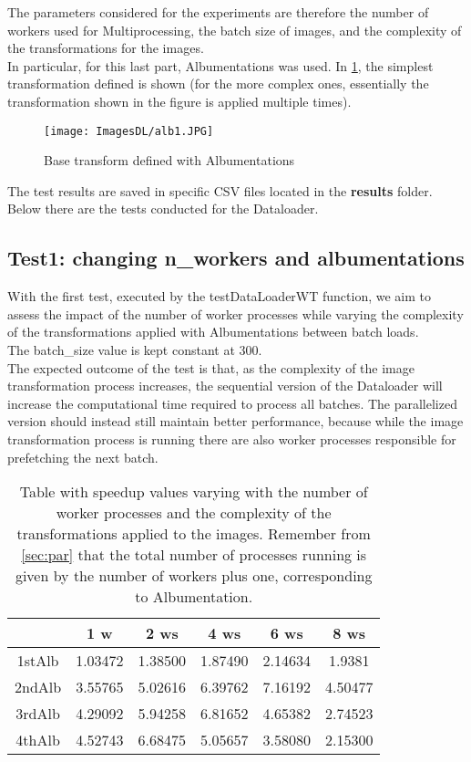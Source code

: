 \documentclass[10pt,twocolumn,letterpaper]{article}
\begin{document}
The parameters considered for the experiments are therefore the number of workers used for Multiprocessing, the batch size of images, and the complexity of the transformations for the images.\\
In particular, for this last part, Albumentations was used. In \cref{fig:alb1}, the simplest transformation defined is shown (for the more complex ones, essentially the transformation shown in the figure is applied multiple times).

\begin{figure}[h]
    \centering
    \texttt{[image: ImagesDL/alb1.JPG]}
    \caption{Base transform defined with Albumentations}
    \label{fig:alb1}
\end{figure}

The test results are saved in specific CSV files located in the \textbf{results} folder.\\
Below there are the tests conducted for the Dataloader.


\subsection{Test1: changing n\_workers and albumentations}


With the first test, executed by the testDataLoaderWT function, we aim to assess the impact of the number of worker processes while varying the complexity of the transformations applied with Albumentations between batch loads.\\
The batch\_size value is kept constant at 300.\\
The expected outcome of the test is that, as the complexity of the image transformation process increases, the sequential version of the Dataloader will increase the computational time required to process all batches. The parallelized version should instead still maintain better performance, because while the image transformation process is running there are also worker processes responsible for prefetching the next batch.

\begin{table}[h]
\centering
\begin{tabular}{ |c|c|c|c|c|c| } 
\hline
 & 1 w & 2 ws & 4 ws & 6 ws & 8 ws\\
 \hline
1stAlb & 1.03472 & 1.38500 & 1.87490 & 2.14634 & 1.9381\\
\hline
2ndAlb & 3.55765 & 5.02616 & 6.39762 & 7.16192 & 4.50477\\
\hline
3rdAlb & 4.29092 & 5.94258 & 6.81652 & 4.65382 & 2.74523\\
\hline
4thAlb & 4.52743 & 6.68475 & 5.05657 & 3.58080 & 2.15300\\
\hline
\end{tabular}
\vspace*{3mm}
\caption{Table with speedup values varying with the number of worker processes and the complexity of the transformations applied to the images. Remember from \cref{sec:par} that the total number of processes running is given by the number of workers plus one, corresponding to Albumentation.}
\label{table:t1}
\end{table}
\end{document}
